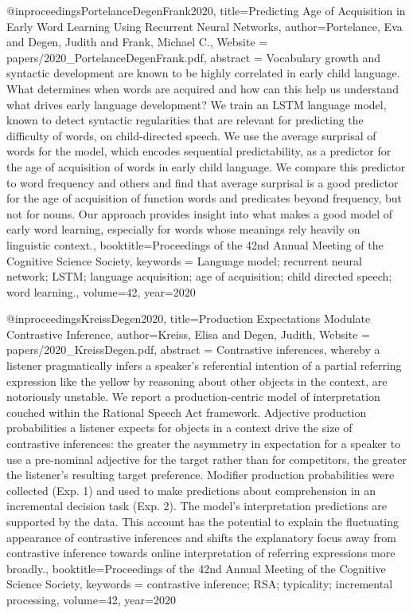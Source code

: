 {@inproceedings{PortelanceDegenFrank2020,
  title={Predicting Age of Acquisition in Early Word Learning Using Recurrent Neural Networks},
  author={Portelance, Eva and Degen, Judith and Frank, Michael C.},
  Website = {papers/2020_PortelanceDegenFrank.pdf},
  abstract = {Vocabulary growth and syntactic development are known to be highly correlated in early child language. What determines when words are acquired and how can this help us understand what drives early language development? We train an LSTM language model, known to detect syntactic regularities that are relevant for predicting the difficulty of words, on child-directed speech. We use the average surprisal of words for the model, which encodes sequential predictability, as a predictor for the age of acquisition of words in early child language. We compare this predictor to word frequency and others and find that average surprisal is a good predictor for the age of acquisition of function words and predicates beyond frequency, but not for nouns. Our approach provides insight into what makes a good model of early word learning, especially for words whose meanings rely heavily on linguistic context.},
  booktitle={Proceedings of the 42nd Annual Meeting of the Cognitive Science Society},
  keywords = {Language model; recurrent neural network; LSTM; language acquisition; age of acquisition; child directed speech; word learning.},
  volume={42},
  year={2020}
}

@inproceedings{KreissDegen2020,
  title={Production Expectations Modulate Contrastive Inference},
  author={Kreiss, Elisa and Degen, Judith},
  Website = {papers/2020_KreissDegen.pdf},
  abstract = {Contrastive inferences, whereby a listener pragmatically infers a speaker’s referential intention of a partial referring expression like the yellow by reasoning about other objects in the context, are notoriously unstable. We report a production-centric model of interpretation couched within the Rational Speech Act framework. Adjective production probabilities a listener expects for objects in a context drive the size of contrastive inferences: the greater the asymmetry in expectation for a speaker to use a pre-nominal adjective for the target rather than for competitors, the greater the listener’s resulting target preference. Modifier production probabilities were collected (Exp. 1) and used to make predictions about comprehension in an incremental decision task (Exp. 2). The model’s interpretation predictions are supported by the data. This account has the potential to explain the fluctuating appearance of contrastive inferences and shifts the explanatory focus away from contrastive inference towards online interpretation of referring expressions more broadly.},
  booktitle={Proceedings of the 42nd Annual Meeting of the Cognitive Science Society},
  keywords = {contrastive inference; RSA; typicality; incremental processing},
  volume={42},
  year={2020}
}

}
